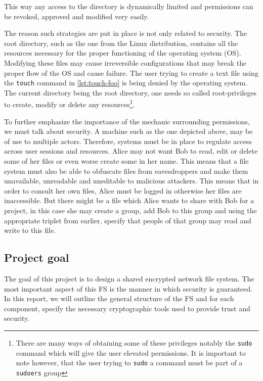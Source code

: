This way any access to the directory is dynamically limited and permissions can be revoked, approved and modified very easily.



The reason such strategies are put in place is not only related to security. The root directory, such as the one from the Linux distribution, contains all the resources necessary for the proper functioning of the operating system (OS). Modifying these files may cause irreversible configurations that may break the proper flow of the OS and cause failure. The user trying to create a text file using the \lstinline{touch}\cite{touch} command in \autoref{lst:touch-foo} is being denied by the operating system. The current directory being the root directory, one needs so called root-privileges to create, modify or delete any resources\footnote{There are many ways of obtaining some of these privileges notably the \lstinline{sudo} command which will give the user elevated permissions. It is important to note however, that the user trying to \lstinline{sudo} a command must be part of a \lstinline{sudoers} group}. 

To further emphasize the importance of the mechanic surrounding permissions, we must talk about security. A machine such as the one depicted above, may be of use to multiple actors. Therefore, systems must be in place to regulate access across user sessions and resources. Alice may not want Bob to read, edit or delete some of her files or even worse create some in her name. This means that a file system must also be able to obfuscate files from eavesdroppers and make them unavailable, unreadable and uneditable to malicious attackers. This means that in order to consult her own files, Alice must be logged in otherwise her files are inaccessible. But there might be a file which Alice wants to share with Bob for a project, in this case she may create a group, add Bob to this group and using the appropriate triplet from earlier, specify that people of that group may read and write to this file. 

\subsection*{Project goal}
The goal of this project is to design a shared encrypted network file system. The most important aspect of this FS is the manner in which security is guaranteed. In this report, we will outline the general structure of the FS and for each component, specify the necessary cryptographic tools used to provide trust and security.



